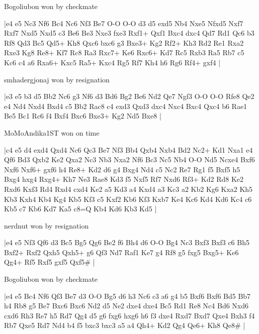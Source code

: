 Bogoliubon won by checkmate

\makegametitle
|e4 e5 Nc3 Nf6 Bc4 Nc6 Nf3 Be7 O-O O-O d3 d5 exd5 Nb4 Nxe5 Nfxd5 Nxf7 Rxf7 Nxd5 Nxd5 c3 Be6 Be3 Nxe3 fxe3 Rxf1+ Qxf1 Bxc4 dxc4 Qd7 Rd1 Qc6 b3 Rf8 Qd3 Bc5 Qd5+ Kh8 Qxc6 bxc6 g3 Bxe3+ Kg2 Rf2+ Kh3 Rd2 Re1 Rxa2 Rxe3 Kg8 Re8+ Kf7 Rc8 Ra3 Rxc7+ Ke6 Rxc6+ Kd7 Rc5 Rxb3 Ra5 Rb7 c5 Kc6 c4 a6 Rxa6+ Kxc5 Ra5+ Kxc4 Rg5 Rf7 Kh4 h6 Rg6 Rf4+ gxf4  |

\showboard

smhadergjonaj won by resignation

\makegametitle
|e3 e5 b3 d5 Bb2 Nc6 g3 Nf6 d3 Bd6 Bg2 Be6 Nd2 Qe7 Ngf3 O-O O-O Rfe8 Qe2 e4 Nd4 Nxd4 Bxd4 c5 Bb2 Rac8 c4 exd3 Qxd3 dxc4 Nxc4 Bxc4 Qxc4 b6 Rae1 Be5 Bc1 Rc6 f4 Bxf4 Bxc6 Bxe3+ Kg2 Nd5 Bxe8  |

\showboard

MoMoAndika1ST won on time

\makegametitle
|c4 e5 d4 exd4 Qxd4 Nc6 Qc3 Be7 Nf3 Bb4 Qxb4 Nxb4 Bd2 Nc2+ Kd1 Nxa1 e4 Qf6 Bd3 Qxb2 Ke2 Qxa2 Nc3 Nb3 Nxa2 Nf6 Bc3 Nc5 Nb4 O-O Nd5 Ncxe4 Bxf6 Nxf6 Nxf6+ gxf6 h4 Re8+ Kd2 d6 g4 Bxg4 Nd4 c5 Nc2 Re7 Rg1 f5 Bxf5 h5 Bxg4 hxg4 Rxg4+ Kh7 Ne3 Rae8 Kd3 f5 Nxf5 Rf7 Nxd6 Rf3+ Kd2 Rd8 Ke2 Rxd6 Kxf3 Rd4 Rxd4 cxd4 Ke2 a5 Kd3 a4 Kxd4 a3 Kc3 a2 Kb2 Kg6 Kxa2 Kh5 Kb3 Kxh4 Kb4 Kg4 Kb5 Kf3 c5 Kxf2 Kb6 Kf3 Kxb7 Ke4 Kc6 Kd4 Kd6 Kc4 c6 Kb5 c7 Kb6 Kd7 Ka5 c8=Q Kb4 Kd6 Kb3 Kd5  |

\showboard

nerdnut won by resignation

\makegametitle
|e4 e5 Nf3 Qf6 d3 Bc5 Bg5 Qg6 Be2 f6 Bh4 d6 O-O Bg4 Nc3 Bxf3 Bxf3 c6 Bh5 Bxf2+ Rxf2 Qxh5 Qxh5+ g6 Qf3 Nd7 Raf1 Ke7 g4 Rf8 g5 fxg5 Bxg5+ Ke6 Qg4+ Rf5 Rxf5 gxf5 Qxf5\#  |

\showboard

Bogoliubon won by checkmate

\makegametitle
|e4 e5 Bc4 Nf6 Qf3 Be7 d3 O-O Bg5 d6 h3 Nc6 c3 a6 g4 b5 Bxf6 Bxf6 Bd5 Bb7 h4 Rb8 g5 Be7 Bxc6 Bxc6 Nd2 d5 Ne2 dxe4 dxe4 Bc5 Rd1 Re8 Nc4 Bd6 Nxd6 cxd6 Rh3 Re7 h5 Rd7 Qg4 d5 g6 fxg6 hxg6 h6 f3 dxe4 Rxd7 Bxd7 Qxe4 Bxh3 f4 Rb7 Qxe5 Rd7 Nd4 b4 f5 bxc3 bxc3 a5 a4 Qh4+ Kd2 Qg4 Qe6+ Kh8 Qe8\#  |

